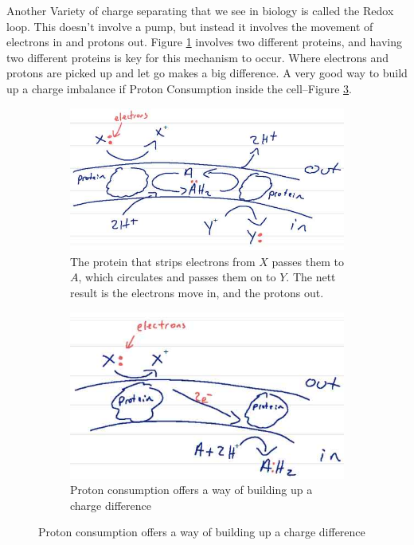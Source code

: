 \documentclass[]{article}
\begin{document}
Another Variety of charge separating that we see in biology is called the Redox loop. This doesn't involve a pump, but instead it involves the movement of electrons in and protons out. Figure \ref{fig:RedoxLoop1} involves two different proteins, and having two different proteins is key for this mechanism to occur.
Where electrons and protons are picked up and let go makes a big difference. A very good way to build up a charge imbalance if Proton Consumption inside the cell--Figure \ref{fig:ProtonConsumption}.
\begin{figure}[H]
	\caption{The Redox Loop}
	\begin{subfigure}[t]{0.45\textwidth}
		\caption{The protein that strips electrons from $X$ passes them to $A$, which circulates and passes them on to $Y$. The nett result is the electrons move in, and the protons out.}\label{fig:RedoxLoop1}
		\includegraphics[width=\textwidth]{RedoxLoop1}
	\end{subfigure}
	\begin{subfigure}[t]{0.45\textwidth}
		\caption{Proton consumption offers a way of building up a charge difference}\label{fig:ProtonConsumption}
		\includegraphics[width=\textwidth]{ProtonConsumption}

\end{subfigure}
\end{figure}
\end{document}
